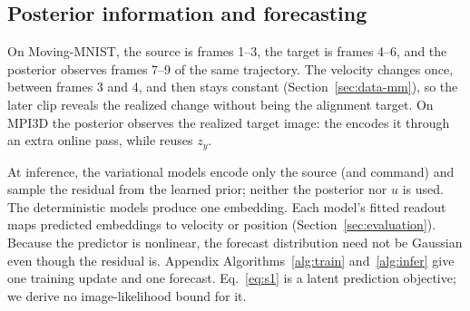 \subsection{Posterior information and forecasting}
\label{sec:posterior-inputs}
\label{sec:inference}

On Moving-MNIST, the source is frames 1--3, the target is frames 4--6, and the posterior observes frames 7--9 of the same trajectory. The velocity changes once, between frames 3 and 4, and then stays constant (Section~\ref{sec:data-mm}), so the later clip reveals the realized change without being the alignment target. On MPI3D the posterior observes the realized target image: the \emavar{} encodes it through an extra online pass, while \shvar{} reuses $z_y$.

At inference, the variational models encode only the source (and command) and sample the residual from the learned prior; neither the posterior nor $u$ is used. The deterministic models produce one embedding. Each model's fitted readout maps predicted embeddings to velocity or position (Section~\ref{sec:evaluation}). Because the predictor is nonlinear, the forecast distribution need not be Gaussian even though the residual is. Appendix Algorithms~\ref{alg:train} and~\ref{alg:infer} give one training update and one forecast. Eq.~\eqref{eq:s1} is a latent prediction objective; we derive no image-likelihood bound for it.
